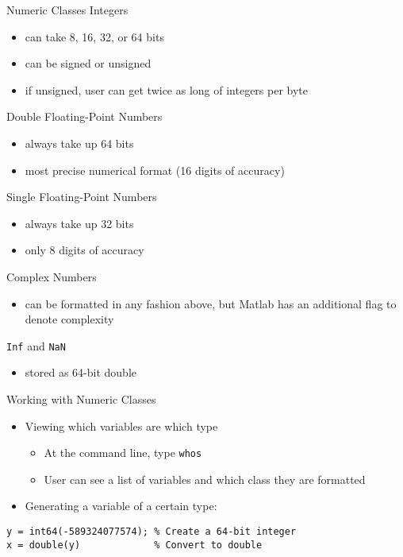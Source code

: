 \documentclass[english,xcolor=dvipsnames]{beamer}
\begin{document}
\begin{frame}{Numeric Classes}
Integers
\begin{itemize}
\item can take 8, 16, 32, or 64 bits
\item can be signed or unsigned
\item if unsigned, user can get twice as long of integers per byte
\end{itemize}
Double Floating-Point Numbers
\begin{itemize}
\item always take up 64 bits
\item most precise numerical format (16 digits of accuracy)
\end{itemize}
Single Floating-Point Numbers
\begin{itemize}
\item always take up 32 bits
\item only 8 digits of accuracy
\end{itemize}
Complex Numbers
\begin{itemize}
\item can be formatted in any fashion above, but Matlab has an additional
flag to denote complexity
\end{itemize}
\texttt{Inf} and \texttt{NaN}
\begin{itemize}
\item stored as 64-bit double
\end{itemize}
\end{frame}


\begin{frame}[fragile]{Working with Numeric Classes}
\begin{itemize}
\item Viewing which variables are which type
\begin{itemize}
\item At the command line, type \texttt{whos}
\item User can see a list of variables and which class they are formatted
\end{itemize}
\item Generating a variable of a certain type:
\end{itemize}
\begin{lstlisting}
y = int64(-589324077574); % Create a 64-bit integer
x = double(y)             % Convert to double
\end{lstlisting}
\end{frame}
\end{document}
